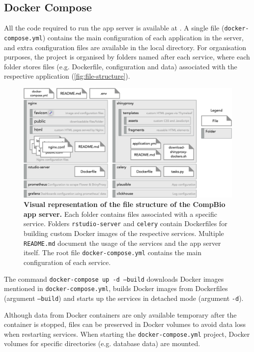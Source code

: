 \subsection{Docker Compose}

All the code required to run the app server is available at . A single file (\texttt{docker-compose.yml}) contains the main configuration of each application in the server, and extra configuration files are available in the local directory. For organisation purposes, the project is organised by folders named after each service, where each folder stores files (e.g. Dockerfile, configuration and data) associated with the respective application (\autoref{fig:file-structure}).

\begin{figure}[!ht]
  \includegraphics[width=1\textwidth]{images/app-server/file-structure}
  \centering
  \caption[App server's file structure]{\textbf{Visual representation of the file structure of the CompBio app server.} Each folder contains files associated with a specific service. Folders \texttt{rstudio-server} and \texttt{celery} contain Dockerfiles for building custom Docker images of the respective services. Multiple \texttt{README.md} document the usage of the services and the app server itself. The root file \texttt{docker-compose.yml} contains the main configuration of each service.}
  \label{fig:file-structure}
\end{figure}

The command \texttt{docker-compose up -d --build} downloads Docker images mentioned in \texttt{docker-compose.yml}, builds Docker images from Dockerfiles (argument \texttt{--build}) and starts up the services in detached mode (argument \texttt{-d}).

Although data from Docker containers are only available temporary after the container is stopped, files can be preserved in Docker volumes to avoid data loss when restarting services. When starting the \texttt{docker-compose.yml} project, Docker volumes for specific directories (e.g. database data) are mounted.

